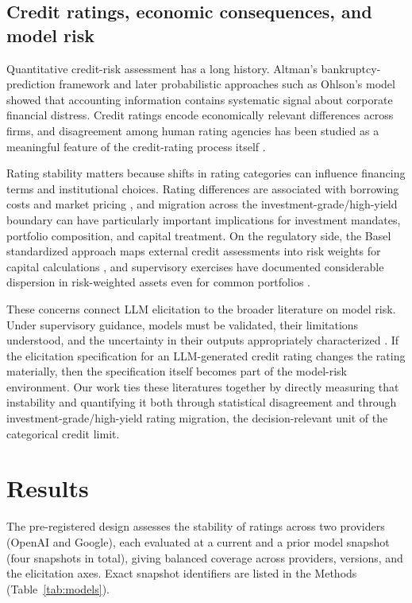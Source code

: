 \documentclass[a4paper,fleqn]{cas-sc}
\begin{document}
\subsection{Credit ratings, economic consequences, and model risk}
Quantitative credit-risk assessment has a long history. Altman's bankruptcy-prediction framework
\citep{altman1968} and later probabilistic approaches such as Ohlson's model \citep{ohlson1980} showed
that accounting information contains systematic signal about corporate financial distress. Credit ratings
encode economically relevant differences across firms, and disagreement among human rating agencies has
been studied as a meaningful feature of the credit-rating process itself
\citep{cantorpacker1997,kligersarig2000,tang2009}.

Rating stability matters because shifts in rating categories can influence financing terms and
institutional choices. Rating differences are associated with borrowing costs and
market pricing \citep{kligersarig2000,tang2009,cornaggia2018}, and migration across the
investment-grade/high-yield boundary can have particularly important implications for investment
mandates, portfolio composition, and capital treatment. On the regulatory side, the Basel standardized
approach maps external credit assessments into risk weights for capital calculations
\citep{bcbs2019cre20}, and supervisory exercises have documented considerable dispersion in risk-weighted
assets even for common portfolios \citep{bcbs2013rcap}.

These concerns connect LLM elicitation to the broader literature on model risk. Under supervisory
guidance, models must be validated, their limitations understood, and the uncertainty in their outputs
appropriately characterized \citep{srletter2011}. If the elicitation specification for an LLM-generated
credit rating changes the rating materially, then the specification itself becomes part of the model-risk
environment. Our work ties these literatures together by directly measuring that instability and
quantifying it both through statistical disagreement and through investment-grade/high-yield rating
migration, the decision-relevant unit of the categorical credit limit.

\section{Results}
The pre-registered design assesses the stability of ratings across two providers (OpenAI and Google),
each evaluated at a current and a prior model snapshot (four snapshots in total), giving balanced
coverage across providers, versions, and the elicitation axes. Exact snapshot identifiers are listed in
the Methods (Table~\ref{tab:models}).
\end{document}
